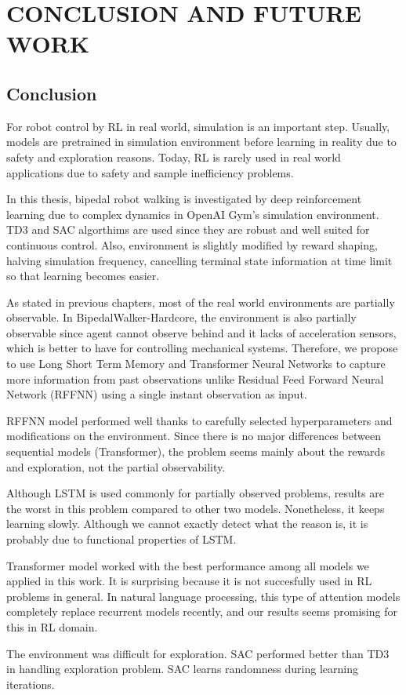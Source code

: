 \chapter{CONCLUSION AND FUTURE WORK}
\label{chap:conclusion_future_work}

\section{Conclusion}
\label{sec:conclusion}
For robot control by RL in real world, simulation is an important step. 
Usually, models are pretrained in simulation environment before learning in reality due to safety and exploration reasons. 
Today, RL is rarely used in real world applications due to safety and sample inefficiency problems. 

In this thesis, bipedal robot walking is investigated by deep  reinforcement learning due to complex dynamics in OpenAI Gym's simulation environment. 
TD3 and SAC algorthims are used since they are robust and well suited for continuous control. 
Also, environment is slightly modified by reward shaping, halving simulation frequency, cancelling terminal state information at time limit so that learning becomes easier.
  
As stated in previous chapters, most of the real world environments are partially observable. 
In BipedalWalker-Hardcore, the environment is also partially observable since agent cannot observe behind and it lacks of acceleration sensors, which is better to have for controlling mechanical systems. 
Therefore, we propose to use Long Short Term Memory and Transformer Neural Networks to capture more information from past observations unlike Residual Feed Forward Neural Network (RFFNN) using a single instant observation as input. 

RFFNN model performed well thanks to carefully selected hyperparameters and modifications on the environment. 
Since there is no major differences between sequential models (Transformer), the problem seems mainly about the rewards and exploration, not the partial observability. 

Although LSTM is used commonly for partially observed problems, results are the worst in this problem compared to other two models. Nonetheless, it keeps learning slowly. 
Although we cannot exactly detect what the reason is, it is probably due to functional properties of LSTM. 

Transformer model worked with the best performance among all models we applied in this work. 
It is surprising because it is not succesfully used in RL problems in general. 
In natural language processing, this type of attention models completely replace recurrent models recently, and our results seems promising for this in RL domain. 

The environment was difficult for exploration. SAC performed better than TD3 in handling exploration problem. SAC learns randomness during learning iterations. 
